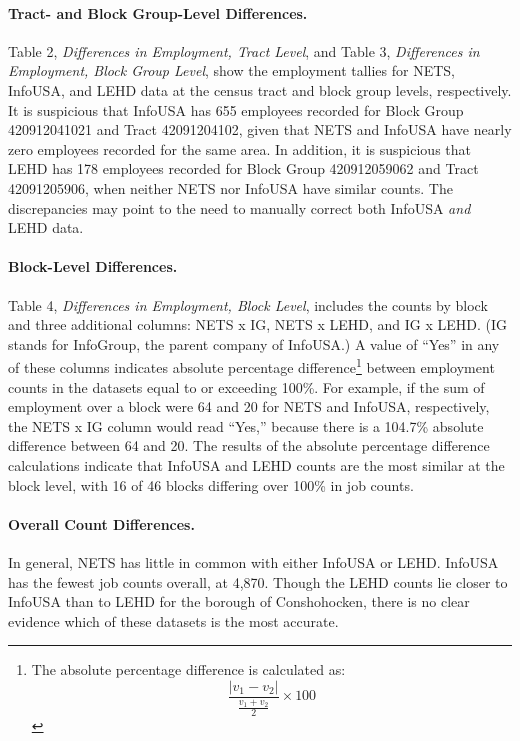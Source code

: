 \documentclass[paper = letter, fontsize = 11pt]{scrartcl}
\begin{document}
\paragraph{Tract- and Block Group-Level Differences.} Table 2, \textit{Differences in Employment, Tract Level}, and Table 3, \textit{Differences in Employment, Block Group Level}, show the employment tallies for NETS, InfoUSA, and LEHD data at the census tract and block group levels, respectively. It is suspicious that InfoUSA has 655 employees recorded for Block Group 420912041021 and Tract 42091204102, given that NETS and InfoUSA have nearly zero employees recorded for the same area. In addition, it is suspicious that LEHD has 178 employees recorded for Block Group 420912059062 and Tract 42091205906, when neither NETS nor InfoUSA have similar counts. The discrepancies may point to the need to manually correct both InfoUSA \textit{and} LEHD data.
\paragraph{Block-Level Differences.} Table 4, \textit{Differences in Employment, Block Level}, includes the counts by block and three additional columns: NETS x IG, NETS x LEHD, and IG x LEHD. (IG stands for InfoGroup, the parent company of InfoUSA.) A value of ``Yes'' in any of these columns indicates absolute percentage difference\footnote{The absolute percentage difference is calculated as: \[ \frac{\lvert v_{1} - v_{2} \rvert}{\frac{v_{1} + v_{2}}{2}} \times 100 \]} between employment counts in the datasets equal to or exceeding 100\%. For example, if the sum of employment over a block were 64 and 20 for NETS and InfoUSA, respectively, the NETS x IG column would read ``Yes,'' because there is a 104.7\% absolute difference between 64 and 20. The results of the absolute percentage difference calculations indicate that InfoUSA and LEHD counts are the most similar at the block level, with 16 of 46 blocks differing over 100\% in job counts.
\paragraph{Overall Count Differences.} In general, NETS has little in common with either InfoUSA or LEHD. InfoUSA has the fewest job counts overall, at 4,870. Though the LEHD counts lie closer to InfoUSA than to LEHD for the borough of Conshohocken, there is no clear evidence which of these datasets is the most accurate.
\end{document}
